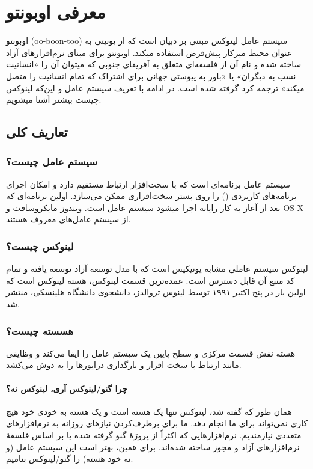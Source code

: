 \chapter{معرفی اوبونتو}
اوبونتو (oo-boon-too) سیستم عامل لینوکس مبتنی بر دبیان است که از یونیتی به عنوان محیط میزکار پیش‌فرض استفاده میکند. اوبونتو برای مبنای نرم‌افزارهای آزاد ساخته شده و نام آن از فلسفه‌ای متعلق به آفریقای جنوبی که میتوان آن را «انسانیت نسب به دیگران» یا «باور به پیوستی جهانی برای اشتراک که تمام انسانیت را متصل میکند» ترجمه کرد گرفته شده است.
در ادامه با تعریف سیستم عامل و این‌که لینوکس چیست بیشتر آشنا میشویم.
\section{تعاریف کلی}
\subsection{سیستم عامل چیست؟}
سیستم عامل برنامه‌ای است که با سخت‌افزار ارتباط مستقیم دارد و امکان اجرای برنامه‌های کاربردی () را روی بستر سخت‌افزاری ممکن می‌سازد.
اولین برنامه‌ای که بعد از آعاز به کار رایانه اجرا میشود سیستم عامل است. ویندوز مایکروسافت و OS X از سیستم عامل‌های معروف هستند.
\subsection{لینوکس چیست؟}
لینوکس سیستم عاملی مشابه یونیکیس است که با مدل توسعه آزاد توسعه یافته و تمام کد منبع آن قابل دسترس است. عمده‌ترین قسمت لینوکس، هسته لینوکس است که اولین بار در پنج اکتبر ۱۹۹۱ توسط لینوس تروالدز، دانشجوی دانشگاه هلینسکی، منتشر شد.
\subsection{هسسته چیست؟}
هسته نقش قسمت مرکزی و سطح پایین یک سیستم عامل را ایفا می‌کند و وظایفی مانند ارتباط با سخت افزار و بارگذاری درایورها را به دوش می‌کشد.
\subsubsection{چرا گنو/لینوکس آری، لینوکس نه؟}
همان طور که گفته شد، لینوکس تنها یک هسته است و یک هسته به خودی خود هیچ کاری نمی‌تواند برای ما انجام دهد. ما برای برطرف‌کردن نیازهای روزانه به نرم‌افزارهای متعددی نیازمندیم. نرم‌افزارهایی که اکثراً از پروژهٔ گنو گرفته شده یا بر اساس فلسفهٔ نرم‌افزارهای آزاد و مجوز  ساخته شده‌اند. برای همین، بهتر است این سیستم عامل (و نه خود هسته) را گنو/لینوکس بنامیم.
